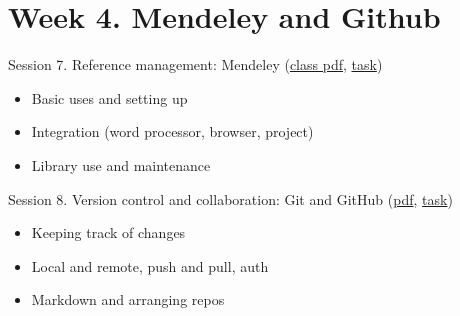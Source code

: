 \documentclass[a4paper,12pt]{article} %
\begin{document}
\section{{\color{red}Week 4. Mendeley and Github}}
	Session 7. Reference management: Mendeley (\href{https://canvas.wlv.ac.uk/courses/33429/files/folder/LaTeX\%20and\%20Mendeley\%20workshop/w1-3_latex?preview=4661728}{class pdf}, \href{https://canvas.wlv.ac.uk/courses/33429/files/folder/LaTeX\%20and\%20Mendeley\%20workshop/w1-3_latex?preview=4661729}{task})
	\begin{itemize}
		\item Basic uses and setting up
		\item Integration (word processor, browser, project)
		\item Library use and maintenance 
	\end{itemize}%
	Session 8. Version control and collaboration: Git and GitHub (\href{}{pdf}, \href{}{task})
	\begin{itemize}
		\item Keeping track of changes
		\item Local and remote, push and pull, auth
		\item Markdown and arranging repos
	\end{itemize}
\end{document}
